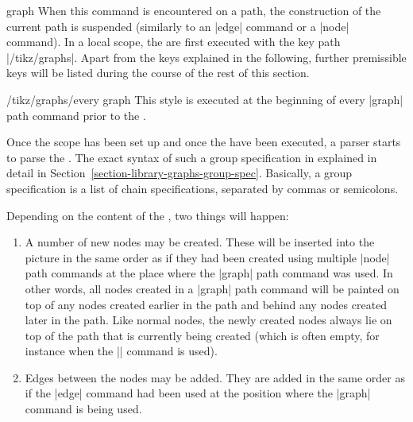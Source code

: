 \begin{pathoperation}{graph}{}
  When this command is encountered on a path, the construction of the
  current path is suspended (similarly to an |edge| command or a
  |node| command). In a local scope, the  are first
  executed with the key path |/tikz/graphs|. Apart from the keys
  explained in the following, further premissible keys will
  be listed during the course of the rest of this section.

  \begin{stylekey}{/tikz/graphs/every graph}
    This style is executed at the beginning of every |graph| path
    command prior to the .
  \end{stylekey}

  Once the scope has been set up and once the  have been
  executed, a parser starts to parse the . The exact syntax of such a group specification
  in explained in detail in
  Section~\ref{section-library-graphs-group-spec}. Basically, a group
  specification is a list of chain specifications, separated by commas
  or semicolons.

  Depending on the content of the , two
  things will happen:
  \begin{enumerate}
  \item A number of new nodes may be created. These will be inserted
    into the picture in the same order as if they had been created
    using multiple |node| path commands at the place where the |graph|
    path command was used. In other words, all nodes created in a
    |graph| path command will be painted on top of any nodes created
    earlier in the path and behind any nodes created later in the
    path. Like normal nodes, the newly created nodes always lie on top
    of the path that is currently being created (which is often
    empty, for instance when the |\graph| command is used).
  \item Edges between the nodes may be added. They are added in the
    same order as if the |edge| command had been used at the position
    where the |graph| command is being used.
  \end{enumerate}


\end{pathoperation}
